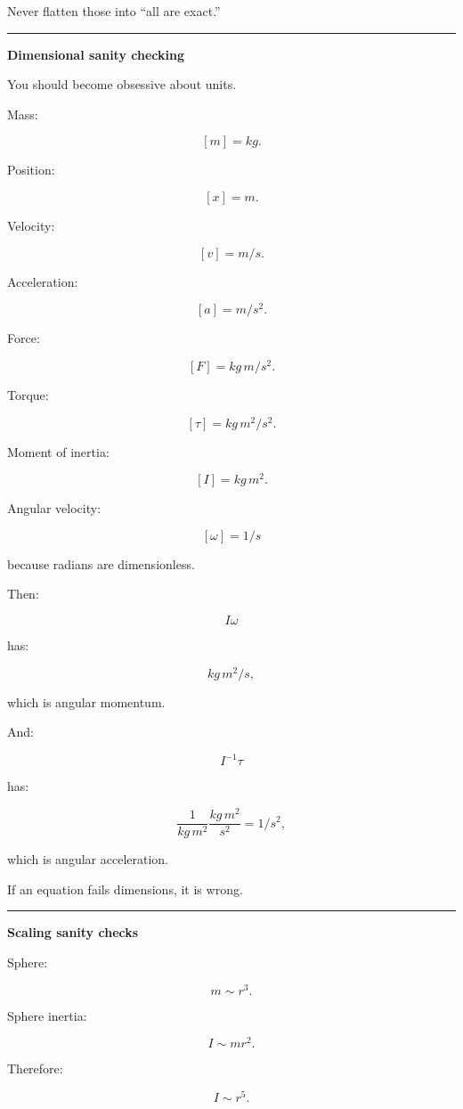Never flatten those into ``all are exact.''

\begin{center}\rule{0.5\linewidth}{0.5pt}\end{center}

\textbf{Dimensional sanity checking}

You should become obsessive about units.

Mass:

\[
[m]=kg.
\]

Position:

\[
[x]=m.
\]

Velocity:

\[
[v]=m/s.
\]

Acceleration:

\[
[a]=m/s^2.
\]

Force:

\[
[F]=kg\,m/s^2.
\]

Torque:

\[
[\tau]=kg\,m^2/s^2.
\]

Moment of inertia:

\[
[I]=kg\,m^2.
\]

Angular velocity:

\[
[\omega]=1/s
\]

because radians are dimensionless.

Then:

\[
I\omega
\]

has:

\[
kg\,m^2/s,
\]

which is angular momentum.

And:

\[
I^{-1}\tau
\]

has:

\[
\frac1{kg\,m^2}
\frac{kg\,m^2}{s^2}
=
1/s^2,
\]

which is angular acceleration.

If an equation fails dimensions, it is wrong.

\begin{center}\rule{0.5\linewidth}{0.5pt}\end{center}

\textbf{Scaling sanity checks}

Sphere:

\[
m\sim r^3.
\]

Sphere inertia:

\[
I\sim mr^2.
\]

Therefore:

\[
I\sim r^5.
\]


